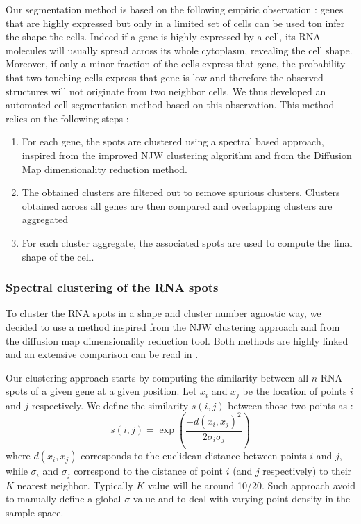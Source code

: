 \documentclass[12pt]{article}
\begin{document}
Our segmentation method is based on the following empiric observation : genes that are highly expressed but only in a limited set of cells can be used ton infer the shape the cells. Indeed if a gene is highly expressed by a cell, its RNA molecules will usually spread across its whole cytoplasm, revealing the cell shape. Moreover, if only a minor fraction of the cells express that gene, the probability that two touching cells express that gene is low and therefore the observed structures will not originate from two neighbor cells.
We thus developed an automated cell segmentation method based on this observation. This method relies on the following steps :
\begin{enumerate}
\item For each gene, the spots are clustered using a spectral based approach, inspired from the improved NJW clustering algorithm and from the Diffusion Map dimensionality reduction method\citep{ng_spectral_2001,zelnik-manor_self-tuning_2004,nadler_diffusion_2005}.
\item The obtained clusters are filtered out to remove spurious clusters. Clusters obtained across all genes are then compared and overlapping clusters are aggregated
\item For each cluster aggregate, the associated spots are used to compute the final shape of the cell.  
\end{enumerate}

\subsubsection{Spectral clustering of the RNA spots}

To cluster the RNA spots in a shape and cluster number agnostic way, we decided to use a method inspired from the NJW clustering approach \citep{ng_spectral_2001,zelnik-manor_self-tuning_2004} and from the diffusion map dimensionality reduction tool. Both methods are highly linked and an extensive comparison can be read in \citep{nadler_diffusion_2005}.

Our clustering approach starts by computing the similarity between all $n$ RNA spots of a given gene at a given position. Let $x_{i}$ and $x_{j}$ be the location of points $i$ and $j$ respectively. We define the similarity $s(i,j)$ between those two points as :
\begin{equation}
s(i,j) = \exp(\frac{-d(x_{i},x_{j})^2}{2\sigma_{i}\sigma_{j}})
\end{equation}
where $d(x_{i},x_{j})$ corresponds to the euclidean distance between points $i$ and $j$, while $\sigma_{i}$ and $\sigma_{j}$ correspond to the distance of point $i$ (and $j$ respectively) to their $K$ nearest neighbor. Typically $K$ value will be around 10/20. Such approach avoid to manually define a global $\sigma$ value and to deal with varying point density in the sample space.
\end{document}
